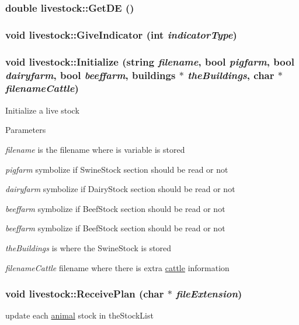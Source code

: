 \label{classlivestock_a99ae9948a427d2119fbc60ee9a64bf75}
\hypertarget{classlivestock_a516359c2727c3410e49f93381eb81655}{
\subsubsection[{GetDE}]{\setlength{\rightskip}{0pt plus 5cm}double livestock::GetDE ()}}
\label{classlivestock_a516359c2727c3410e49f93381eb81655}
\hypertarget{classlivestock_aae415bfbff87815b91ae3968a6859f30}{
\subsubsection[{GiveIndicator}]{\setlength{\rightskip}{0pt plus 5cm}void livestock::GiveIndicator (int {\em indicatorType})}}
\label{classlivestock_aae415bfbff87815b91ae3968a6859f30}
\hypertarget{classlivestock_a8c295c86b0d0a7f216289f90da298645}{
\subsubsection[{Initialize}]{\setlength{\rightskip}{0pt plus 5cm}void livestock::Initialize (string {\em filename}, \/  bool {\em pigfarm}, \/  bool {\em dairyfarm}, \/  bool {\em beeffarm}, \/  {\bf buildings} $\ast$ {\em theBuildings}, \/  char $\ast$ {\em filenameCattle})}}
\label{classlivestock_a8c295c86b0d0a7f216289f90da298645}
Initialize a live stock 
\begin{DoxyParams}{Parameters}
\item[{\em filename}]is the filename where is variable is stored \item[{\em pigfarm}]symbolize if SwineStock section should be read or not \item[{\em dairyfarm}]symbolize if DairyStock section should be read or not \item[{\em beeffarm}]symbolize if BeefStock section should be read or not \item[{\em beeffarm}]symbolize if BeefStock section should be read or not \item[{\em theBuildings}]is where the SwineStock is stored \item[{\em filenameCattle}]filename where there is extra \hyperlink{classcattle}{cattle} information \end{DoxyParams}
\hypertarget{classlivestock_ac94281ef5c9118aad90e6d722130cff5}{
\subsubsection[{ReceivePlan}]{\setlength{\rightskip}{0pt plus 5cm}void livestock::ReceivePlan (char $\ast$ {\em fileExtension})}}
\label{classlivestock_ac94281ef5c9118aad90e6d722130cff5}
update each \hyperlink{classanimal}{animal} stock in theStockList 

